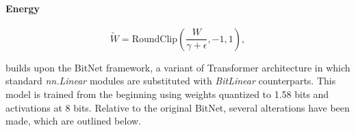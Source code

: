 \paragraph{Energy}

\begin{equation}
    \widetilde{W} = \mathrm{RoundClip}(\frac{W}{\gamma + \epsilon}, -1, 1),
\end{equation}

 builds upon the BitNet framework, a variant of Transformer architecture in which standard \emph{nn.Linear} modules are substituted with \emph{BitLinear} counterparts. This model is trained from the beginning using weights quantized to 1.58 bits and activations at 8 bits. Relative to the original BitNet, several alterations have been made, which are outlined below.